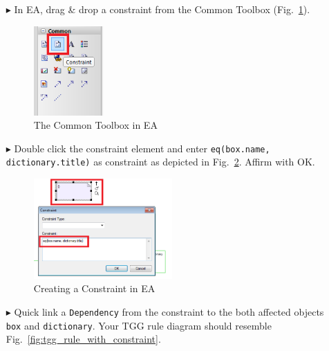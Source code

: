 \begin{enumerate}
\item[$\blacktriangleright$] In EA, drag \& drop a constraint from the Common Toolbox (Fig.~\ref{fig:common_toolbox}).

\begin{figure}[htbp]
\begin{center}
  \includegraphics[width=0.25\textwidth]{pics/tggBilder/tggRule/tgg12}
  \caption{The Common Toolbox in EA}  
  \label{fig:common_toolbox}
\end{center}
\end{figure}

\item[$\blacktriangleright$] Double click the constraint element and enter \texttt{eq(box.name, dictionary.title)} as constraint as depicted in Fig.~\ref{fig:first_tgg_constraint}. 
Affirm with OK.

\begin{figure}[htbp]
\begin{center}
  \includegraphics[width=0.5\textwidth]{pics/tggBilder/tggRule/tgg13}
  \caption{Creating a Constraint in EA}  
  \label{fig:first_tgg_constraint}
\end{center}
\end{figure}

\item[$\blacktriangleright$] Quick link a \texttt{Dependency} from the constraint to the both affected objects \texttt{box} and \texttt{dictionary}. 
Your TGG rule diagram should resemble Fig.~\ref{fig:tgg_rule_with_constraint}. 


\end{enumerate}
